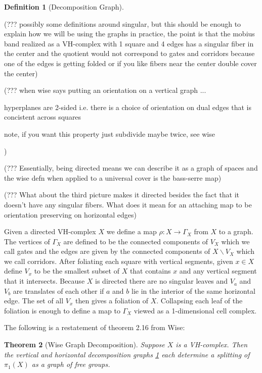 \documentclass[12pt,parskip=full]{report}
\theoremstyle{plain}
\newtheorem{thm}{Theorem}[section]
\theoremstyle{definition}
\newtheorem{dfn}[thm]{Definition}
\begin{document}
\begin{dfn}
    [Decomposition Graph]
    \label{dfn:decompositiongraph}
    
    (??? possibly some definitions around singular, but this should be enough to explain how we will be using the graphs in practice, the point is that the mobius band realized as a VH-complex with 1 square and 4 edges has a singular fiber in the center and the quotient would not correspond to gates and corridors because one of the edges is getting folded or if you like fibers near the center double cover the center)
    
    (??? when wise says putting an orientation on a vertical graph ... 
    
    
    hyperplanes are 2-sided i.e. there is a choice of orientation on dual edges that is concistent across squares
    
    note, if you want this property just subdivide maybe twice, see wise
    
    )
    
    (??? Essentially, being directed means we can describe it as a graph of spaces and the wise defn when applied to a universal cover is the bass-serre map)
    
    (??? What about the third picture makes it directed besides the fact that it doesn't have any singular fibers. What does it mean for an attaching map to be orientation preserving on horizontal edges)
    
    Given a directed VH-complex \(X\) we define a map \(\rho: X\to \Gamma_X\) from \(X\) to a graph. The vertices of \(\Gamma_X\) are defined to be the connected components of \(V_X\) which we call gates and the edges are given by the connected components of \(X\smallsetminus V_X\) which we call corridors. After foliating each square with vertical segments, given \(x\in X\) define \(V_x\) to be the smallest subset of \(X\) that contains \(x\) and any vertical segment that it intersects. Because \(X\) is directed there are no singular leaves and \(V_a\) and \(V_b\) are translates of each other if \(a\) and \(b\) lie in the interior of the same horizontal edge. The set of all \(V_x\) then gives a foliation of \(X\). Collapsing each leaf of the foliation is enough to define a map to \(\Gamma_X\) viewed as a 1-dimensional cell complex. 
\end{dfn}

The following is a restatement of theorem 2.16 \cite{wisethesis} from Wise:
\begin{thm}[Wise Graph Decomposition]
\label{thm:wisegraph}
Suppose \(X\) is a VH-complex. Then the vertical and horizontal decomposition graphs \ref{dfn:decompositiongraph} each determine a splitting of \(\pi_1(X)\) as a graph of free groups. 
\end{thm}
\end{document}
